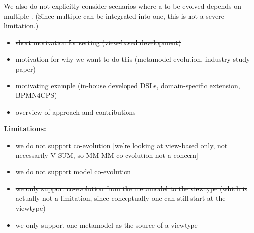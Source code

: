 We also do not explicitly consider scenarios where a \viewtype to be evolved depends on multiple \metamodels. (Since multiple \metamodels can be integrated into one, this is not a severe limitation.)

\begin{itemize}
    \item \st{short motivation for setting (view-based development)}
    \item \st{motivation for why we want to do this (metamodel evolution, industry study paper)}
    \item motivating example (in-house developed DSLs, domain-specific \metamodel extension, BPMN4CPS)
    \item overview of approach and contributions
\end{itemize}

\textbf{Limitations:}
\begin{itemize}
    \item we do not support \metamodel \metamodel co-evolution [we’re looking at view-based only, not necessarily V-SUM, so MM-MM co-evolution not a concern]
    \item we do not support \metamodel model co-evolution
    \item \st{we only support co-evolution from the metamodel to the viewtype (which is actually not a limitation, since conceptually one can still start at the viewtype)}
    \item \st{we only support one metamodel as the source of a viewtype}
\end{itemize}

